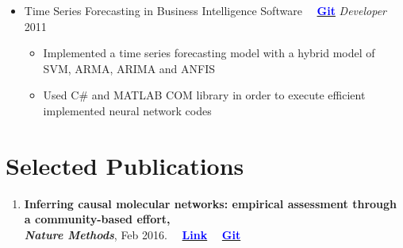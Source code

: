 \documentclass[letter]{res}
\begin{document}
\begin{resume}
\begin{itemize}[leftmargin=-.1in]
			\item Time Series Forecasting in Business Intelligence Software ~~{\href{https://github.com/omid55/time_series_forecasting_business_intelligence}{\textbf{\textcolor{blue}{Git}}}}
			\newline
			{\sl Developer} \hfill 2011\\
			\vspace{-4mm}
			\iflong
			\begin{itemize}
				\item Implemented a time series forecasting model with a hybrid model of SVM, ARMA, ARIMA and ANFIS
				\item Used C\# and MATLAB COM library in order to execute efficient implemented neural network codes
			\end{itemize}
			\fi
			
		\end{itemize}
		
		
		\section{Selected Publications}
		\begin{enumerate}[leftmargin=-.01in]
			\item \textbf{Inferring causal molecular networks: empirical assessment through a community-based effort,}\\ \textbf{\textit{Nature Methods}}, Feb 2016.
 			~~\href{http://www.nature.com/nmeth/journal/vaop/ncurrent/full/nmeth.3773.html}{\textbf{\textcolor{blue}{Link}}}
			~~\href{https://github.com/omid55/nature_causal_network}{\textbf{\textcolor{blue}{Git}}}
			

\end{enumerate}
\end{resume}
\end{document}

